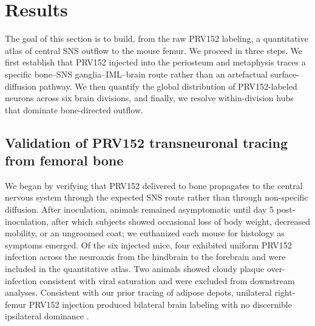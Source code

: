\documentclass[11pt]{article}
\begin{document}
\section{Results}\label{sec:results}

The goal of this section is to build, from the raw PRV152 labeling, a quantitative atlas of central SNS outflow to the mouse femur. We proceed in three steps. We first establish that PRV152 injected into the periosteum and metaphysis traces a specific bone--SNS ganglia--IML--brain route rather than an artefactual surface-diffusion pathway. We then quantify the global distribution of PRV152-labeled neurons across six brain divisions, and finally, we resolve within-division hubs that dominate bone-directed outflow.

\subsection{Validation of PRV152 transneuronal tracing from femoral bone}

We began by verifying that PRV152 delivered to bone propagates to the central nervous system through the expected SNS route rather than through non-specific diffusion. After inoculation, animals remained asymptomatic until day 5 post-inoculation, after which subjects showed occasional loss of body weight, decreased mobility, or an ungroomed coat; we euthanized each mouse for histology as symptoms emerged. Of the six injected mice, four exhibited uniform PRV152 infection across the neuroaxis from the hindbrain to the forebrain and were included in the quantitative atlas. Two animals showed cloudy plaque over-infection consistent with viral saturation and were excluded from downstream analyses. Consistent with our prior tracing of adipose depots, unilateral right-femur PRV152 injection produced bilateral brain labeling with no discernible ipsilateral dominance \citep{bamshad1998central,bartness1998innervation,ryu2014short}.
\end{document}
